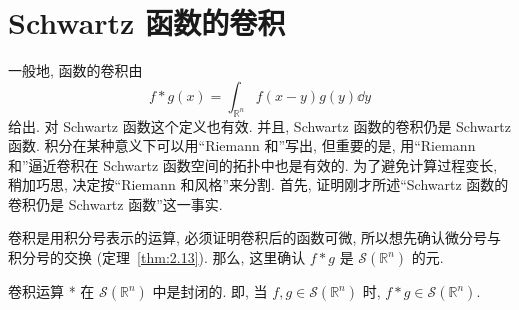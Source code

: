 
\section{Schwartz 函数的卷积}\label{sec:5.2}

一般地, 函数的卷积由
\[
f * g(x) = \int_{\mathbb{R}^{n}}f(x-y)g(y)\dd y
\]
给出. 对 Schwartz 函数这个定义也有效. 并且, Schwartz 函数的卷积仍是 Schwartz 函数. 积分在某种意义下可以用``Riemann 和''写出, 但重要的是, 用``Riemann 和''逼近卷积在 Schwartz 函数空间的拓扑中也是有效的. 为了避免计算过程变长, 稍加巧思, 决定按``Riemann 和风格''来分割. 首先, 证明刚才所述``Schwartz 函数的卷积仍是 Schwartz 函数''这一事实.

卷积是用积分号表示的运算, 必须证明卷积后的函数可微, 所以想先确认微分号与积分号的交换 (定理~\ref{thm:2.13}). 那么, 这里确认 $f * g$ 是 $\mathcal{S}(\mathbb{R}^{n})$ 的元.

\begin{theorem}\label{thm:5.2}
卷积运算 * 在 $\mathcal{S}(\mathbb{R}^{n})$ 中是封闭的. 即, 当 $f, g \in \mathcal{S}(\mathbb{R}^{n})$ 时, $f * g \in \mathcal{S}(\mathbb{R}^{n})$.
\end{theorem}

